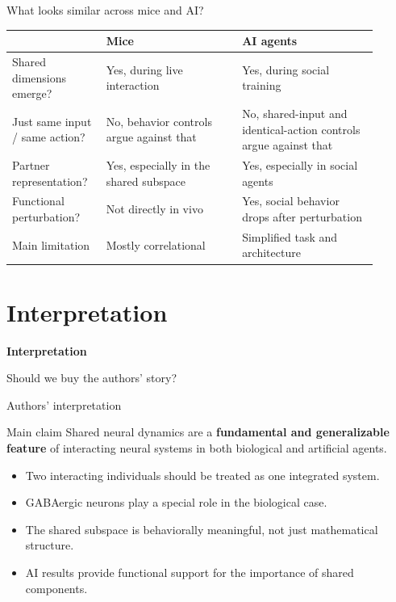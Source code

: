 \documentclass[aspectratio=169,11pt]{beamer}
\newcommand{\sectiondivider}[2]{
  \begin{frame}[plain]
    \vfill
    {\color{accentblue}\LARGE\bfseries #1\par}
    \vspace{0.5em}
    {\large #2\par}
    \vfill
  \end{frame}
}
\begin{document}
\begin{frame}{What looks similar across mice and AI?}
\begin{center}
\small
\begin{tabular}{>{\raggedright\arraybackslash}p{0.22\linewidth} >{\raggedright\arraybackslash}p{0.34\linewidth} >{\raggedright\arraybackslash}p{0.34\linewidth}}
\toprule
 & \textbf{Mice} & \textbf{AI agents} \\
\midrule
Shared dimensions emerge? & Yes, during live interaction & Yes, during social training \\
Just same input / same action? & No, behavior controls argue against that & No, shared-input and identical-action controls argue against that \\
Partner representation? & Yes, especially in the shared subspace & Yes, especially in social agents \\
Functional perturbation? & Not directly in vivo & Yes, social behavior drops after perturbation \\
Main limitation & Mostly correlational & Simplified task and architecture \\
\bottomrule
\end{tabular}
\end{center}
\end{frame}

\section{Interpretation}
\sectiondivider{Interpretation}{Should we buy the authors' story?}

\begin{frame}{Authors' interpretation}
\begin{block}{Main claim}
Shared neural dynamics are a \textbf{fundamental and generalizable feature} of interacting neural systems in both biological and artificial agents.
\end{block}
\vspace{0.4em}
\begin{itemize}
  \item Two interacting individuals should be treated as one integrated system.
  \item GABAergic neurons play a special role in the biological case.
  \item The shared subspace is behaviorally meaningful, not just mathematical structure.
  \item AI results provide functional support for the importance of shared components.
\end{itemize}
\end{frame}
\end{document}
